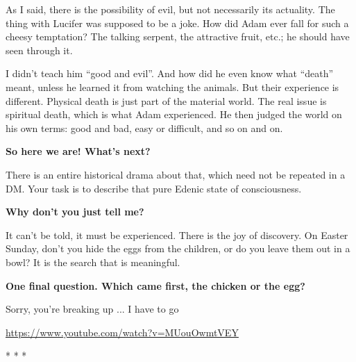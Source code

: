 As I said, there is the possibility of evil, but not necessarily its actuality. The thing with Lucifer was supposed to be a joke. How did Adam ever fall for such a cheesy temptation? The talking serpent, the attractive fruit, etc.; he should have seen through it.

I didn't teach him ``good and evil''. And how did he even know what ``death'' meant, unless he learned it from watching the animals. But their experience is different. Physical death is just part of the material world. The real issue is spiritual death, which is what Adam experienced. He then judged the world on his own terms: good and bad, easy or difficult, and so on and on.

\textbf{So here we are! What's next?}


There is an entire historical drama about that, which need not be repeated in a DM. Your task is to describe that pure Edenic state of consciousness.

\textbf{Why don't you just tell me?}


It can't be told, it must be experienced. There is the joy of discovery. On Easter Sunday, don't you hide the eggs from the children, or do you leave them out in a bowl? It is the search that is meaningful.

\textbf{One final question. Which came first, the chicken or the egg?}


Sorry, you're breaking up ... I have to go

\url{https://www.youtube.com/watch?v=MUouOwmtVEY} 


\begin{center}* * *\end{center}

